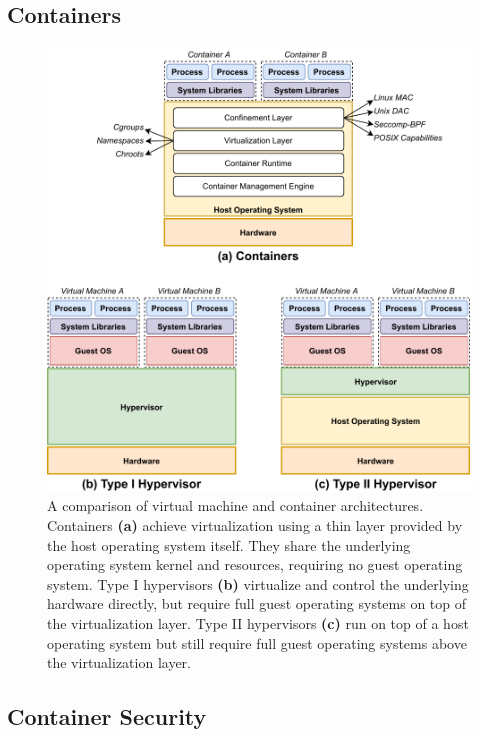 \subsection{Containers}%
\label{ss:containers-bg}

\begin{figure}[tbp]
  \centering
  \includegraphics[width=0.8\linewidth]{figs/background/virtualization.pdf}
  \caption[A comparison of virtual machine and container architectures]{
    A comparison of virtual machine and container architectures. Containers \textbf{(a)}
    achieve virtualization using a thin layer provided by the host operating system
    itself. They share the underlying operating system kernel and resources, requiring no
    guest operating system. Type I hypervisors \textbf{(b)} virtualize and control the
    underlying hardware directly, but require full guest operating systems on top of the
    virtualization layer. Type II hypervisors \textbf{(c)} run on top of a host operating
    system but still require full guest operating systems above the virtualization layer.
  }%
  \label{fig:virt}
\end{figure}

\subsection{Container Security}%
\label{ss:container-security-bg}







